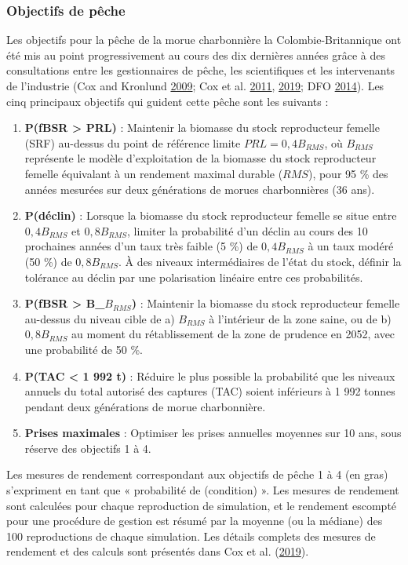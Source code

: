 \documentclass[11pt]{book}
\begin{document}
\hypertarget{objectifs-de-puxeache}{%
\subsubsection{Objectifs de pêche}\label{objectifs-de-puxeache}}

Les objectifs pour la pêche de la morue charbonnière la Colombie-Britannique ont été mis au point progressivement au cours des dix dernières années grâce à des consultations entre les gestionnaires de pêche, les scientifiques et les intervenants de l'industrie (Cox and Kronlund \protect\hyperlink{ref-cox2009evaluation}{2009}; Cox et al. \protect\hyperlink{ref-cox2011management}{2011}, \protect\hyperlink{ref-cox2019evaluating}{2019}; DFO \protect\hyperlink{ref-dfo2014performanc}{2014}). Les cinq principaux objectifs qui guident cette pêche sont les suivants :
\begin{enumerate}
\def\labelenumi{\arabic{enumi}.}

\item
  \textbf{P(fBSR \textgreater{} PRL)} : Maintenir la biomasse du stock reproducteur femelle (SRF) au-dessus du point de référence limite \(PRL = 0,4B_{RMS}\), où \(B_{RMS}\) représente le modèle d'exploitation de la biomasse du stock reproducteur femelle équivalant à un rendement maximal durable (\(RMS\)), pour 95 \% des années mesurées sur deux générations de morues charbonnières (36 ans).
\item
  \textbf{P(déclin)} : Lorsque la biomasse du stock reproducteur femelle se situe entre \(0,4B_{RMS}\) et \(0,8B_{RMS}\), limiter la probabilité d'un déclin au cours des 10 prochaines années d'un taux très faible (5 \%) de \(0,4B_{RMS}\) à un taux modéré (50 \%) de \(0,8B_{RMS}\). À des niveaux intermédiaires de l'état du stock, définir la tolérance au déclin par une polarisation linéaire entre ces probabilités.
\item
  \textbf{P(fBSR \textgreater{} B\_\(B_{RMS}\))} : Maintenir la biomasse du stock reproducteur femelle au-dessus du niveau cible de a) \(B_{RMS}\) à l'intérieur de la zone saine, ou de b) \(0,8B_{RMS}\) au moment du rétablissement de la zone de prudence en 2052, avec une probabilité de 50 \%.
\item
  \textbf{P(TAC \textless{} 1 992 t)} : Réduire le plus possible la probabilité que les niveaux annuels du total autorisé des captures (TAC) soient inférieurs à 1 992 tonnes pendant deux générations de morue charbonnière.
\item
  \textbf{Prises maximales} : Optimiser les prises annuelles moyennes sur 10 ans, sous réserve des objectifs 1 à 4.
\end{enumerate}
Les mesures de rendement correspondant aux objectifs de pêche 1 à 4 (en gras) s'expriment en tant que « probabilité de (condition) ». Les mesures de rendement sont calculées pour chaque reproduction de simulation, et le rendement escompté pour une procédure de gestion est résumé par la moyenne (ou la médiane) des 100 reproductions de chaque simulation. Les détails complets des mesures de rendement et des calculs sont présentés dans Cox et al. (\protect\hyperlink{ref-cox2019evaluating}{2019}).
\end{document}
